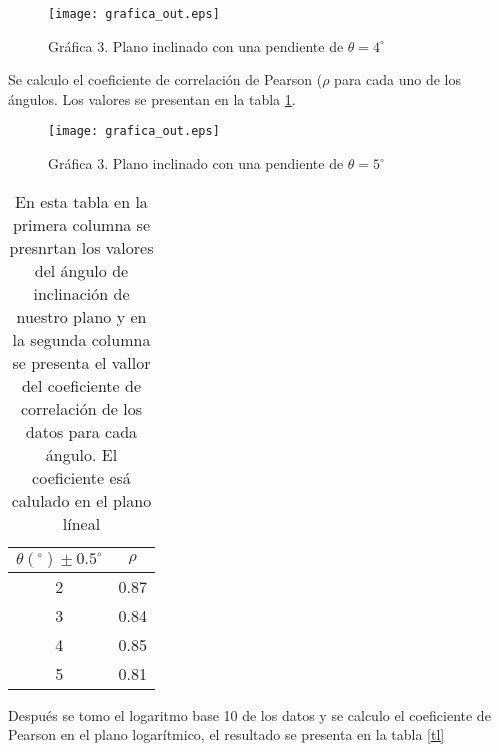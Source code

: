 \documentclass[12pt,letterpaper]{article}
\begin{document}
\begin{figure}[!h]

\begin{center}
\texttt{[image: grafica\_out.eps]} 
\caption{Gráfica 3. Plano inclinado con una pendiente de $\theta= 4^{\circ}$}\label{gra3}
\end{center}
\end{figure}

Se calculo el coeficiente de correlación de Pearson ($\rho$ para cada uno de los ángulos. Los valores se presentan en la tabla \ref{t1}.

\begin{figure}[!h]

\begin{center}
\texttt{[image: grafica\_out.eps]} 
\caption{Gráfica 3. Plano inclinado con una pendiente de $\theta= 5^{\circ}$}\label{gra4}
\end{center}
\end{figure}


\begin{table}[!h]
\begin{center}
\begin{tabular}{cc}
\hline 
$\theta (^{\circ}) \pm 0.5 ^{\circ}$ &  $\rho$ \\ 
\hline
\hline 
2 & 0.87 \\ 
 
3 & 0.84 \\ 

4 & 0.85 \\ 

5 & 0.81 \\
\hline 
\end{tabular}
\caption{En esta tabla en la primera columna se presnrtan los valores del ángulo de inclinación de nuestro plano y en la segunda columna se presenta el vallor del coeficiente de correlación de los datos para cada ángulo. El coeficiente esá calulado en el plano líneal}\label{t1}
\end{center}
\end{table}

Después se tomo el logaritmo base 10 de los datos y se calculo el coeficiente de Pearson en el plano logarítmico, el resultado se presenta en la tabla \ref{tl}
\end{document}
